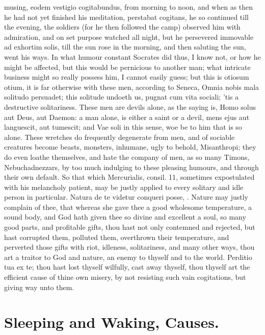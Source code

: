 {musing, eodem vestigio cogitabundus, from morning to noon, and when as
then he had not yet finished his meditation, perstabat cogitans, he so
continued till the evening, the soldiers (for he then followed the
camp) observed him with admiration, and on set purpose watched all
night, but he persevered immovable ad exhortim solis, till the sun rose
in the morning, and then saluting the sun, went his ways. In what
humour constant Socrates did thus, I know not, or how he might be
affected, but this would be pernicious to another man; what intricate
business might so really possess him, I cannot easily guess; but this
is otiosum otium, it is far otherwise with these men, according to
Seneca, Omnia nobis mala solitudo persuadet; this solitude undoeth us,
pugnat cum vita sociali; 'tis a destructive solitariness. These men are
devils alone, as the saying is, Homo solus aut Deus, aut Daemon: a man
alone, is either a saint or a devil, mens ejus aut languescit, aut
tumescit; and Vae soli in this sense, woe be to him that is so
alone. These wretches do frequently degenerate from men, and of
sociable creatures become beasts, monsters, inhumane, ugly to behold,
Misanthropi; they do even loathe themselves, and hate the company of
men, as so many Timons, Nebuchadnezzars, by too much indulging to these
pleasing humours, and through their own default. So that which
Mercurialis, consil. 11, sometimes expostulated with his melancholy
patient, may be justly applied to every solitary and idle person in
particular. Natura de te videtur conqueri posse, \etc{}. Nature may
justly complain of thee, that whereas she gave thee a good wholesome
temperature, a sound body, and God hath given thee so divine and
excellent a soul, so many good parts, and profitable gifts, thou hast
not only contemned and rejected, but hast corrupted them, polluted
them, overthrown their temperature, and perverted those gifts with
riot, idleness, solitariness, and many other ways, thou art a traitor
to God and nature, an enemy to thyself and to the world. Perditio tua
ex te; thou hast lost thyself wilfully, cast away thyself, thou thyself
art the efficient cause of thine own misery, by not resisting such vain
cogitations, but giving way unto them.

\section{Sleeping and Waking, Causes.}

}

